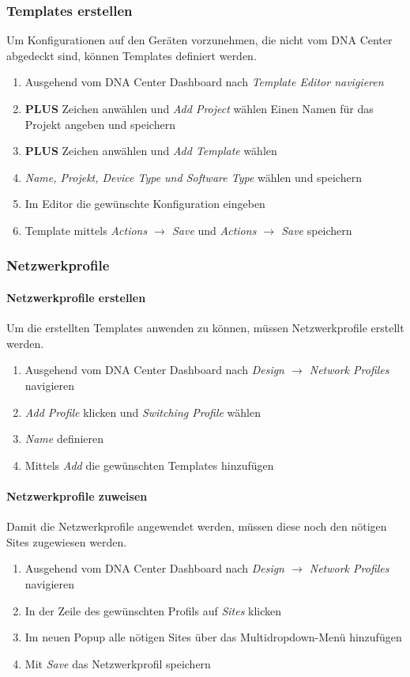 \subsubsection{Templates erstellen}
Um Konfigurationen auf den Geräten vorzunehmen, die nicht vom DNA Center abgedeckt sind, können Templates definiert werden.
\begin{enumerate}
	\item Ausgehend vom DNA Center Dashboard nach \textit{Template Editor navigieren}
	\item \textbf{PLUS} Zeichen anwählen und \textit{Add Project} wählen
	\subitem Einen Namen für das Projekt angeben und speichern
	\item \textbf{PLUS} Zeichen anwählen und \textit{Add Template} wählen
	\item \textit{Name, Projekt, Device Type und Software Type} wählen und speichern
	\item Im Editor die gewünschte Konfiguration eingeben
	\item Template mittels \textit{Actions $\rightarrow$ Save} und \textit{Actions $\rightarrow$ Save} speichern
\end{enumerate}

\subsubsection{Netzwerkprofile}
\paragraph{Netzwerkprofile erstellen}
Um die erstellten Templates anwenden zu können, müssen Netzwerkprofile erstellt werden.
\begin{enumerate}
	\item Ausgehend vom DNA Center Dashboard nach \textit{Design $\rightarrow$ Network Profiles} navigieren
	\item \textit{Add Profile} klicken und \textit{Switching Profile} wählen
	\item \textit{Name} definieren
	\item Mittels \textit{Add} die gewünschten Templates hinzufügen
\end{enumerate}

\paragraph{Netzwerkprofile zuweisen}
Damit die Netzwerkprofile angewendet werden, müssen diese noch den nötigen Sites zugewiesen werden.
\begin{enumerate}
	\item Ausgehend vom DNA Center Dashboard nach \textit{Design $\rightarrow$ Network Profiles} navigieren
	\item In der Zeile des gewünschten Profils auf \textit{Sites} klicken
	\item Im neuen Popup alle nötigen Sites über das Multidropdown-Menü hinzufügen
	\item Mit \textit{Save} das Netzwerkprofil speichern
\end{enumerate}

